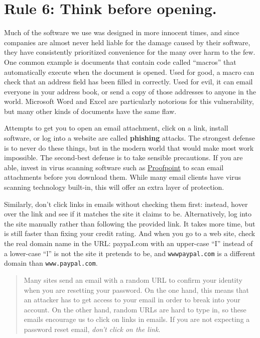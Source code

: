 \documentclass[10pt,letterpaper]{article}
\begin{document}
\section*{Rule 6: Think before opening.}

Much of the software we use was designed in more innocent times, and since
companies are almost never held liable for the damage caused by their software,
they have consistently prioritized convenience for the many over harm to the
few. One common example is documents that contain code called ``macros'' that
automatically execute when the document is opened. Used for good, a macro can
check that an address field has been filled in correctly. Used for evil, it can
email everyone in your address book, or send a copy of those addresses to anyone
in the world.  Microsoft Word and Excel are particularly notorious for this
vulnerability, but many other kinds of documents have the same flaw.

Attempts to get you to open an email attachment, click on a link, install
software, or log into a website are called \textbf{phishing} attacks. The
strongest defense is to never do these things, but in the modern world that
would make most work impossible. The second-best defense is to take sensible
precautions. If you are able, invest in virus scanning software such as
\href{https://www.proofpoint.com/us/products/email-protection}{Proofpoint}
to scan email attachments before you download them. While many email clients
have virus scanning technology built-in, this will offer an extra layer of
protection.

Similarly, don't click links in emails without checking them first: instead,
hover over the link and see if it matches the site it claims to be.
Alternatively, log into the site manually rather than following the provided
link. It takes more time, but is still faster than fixing your credit rating.
And when you go to a web site, check the real domain name in the URL: paypaI.com
with an upper-case ``I'' instead of a lower-case ``l'' is not the site it
pretends to be, and \texttt{wwwpaypal.com} is a different domain than
\texttt{www.paypal.com}.

\begin{quote}
  Many sites send an email with a random URL to confirm your identity when you
  are resetting your password. On the one hand, this means that an attacker has
  to get access to your email in order to break into your account. On the other
  hand, random URLs are hard to type in, so these emails encourage us to click
  on links in emails. If you are not expecting a password reset
  email, \emph{don't click on the link}.
\end{quote}
\end{document}
